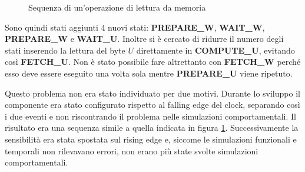 \begin{figure}[!ht]
    \centering
    \caption{Sequenza di un'operazione di lettura da memoria}
    \label{fig:letturamemoria}
\end{figure}

Sono quindi stati aggiunti 4 nuovi stati: \textbf{PREPARE\_W}, \textbf{WAIT\_W}, \textbf{PREPARE\_W} e \textbf{WAIT\_U}. Inoltre si è cercato di ridurre il numero degli stati inserendo la lettura del byte $U$ direttamente in \textbf{COMPUTE\_U}, evitando così \textbf{FETCH\_U}. Non è stato possibile fare altrettanto con \textbf{FETCH\_W} perché esso deve essere eseguito una volta sola mentre \textbf{PREPARE\_U} viene ripetuto.

Questo problema non era stato individuato per due motivi. Durante lo sviluppo il componente era stato configurato rispetto al falling edge del clock, separando così i due eventi e non riscontrando il problema nelle simulazioni comportamentali. Il risultato era una sequenza simile a quella indicata in figura \ref{fig:letturamemoria}. Successivamente la sensibilità era stata spostata sul rising edge e, siccome le simulazioni funzionali e temporali non rilevavano errori, non erano più state svolte simulazioni comportamentali.